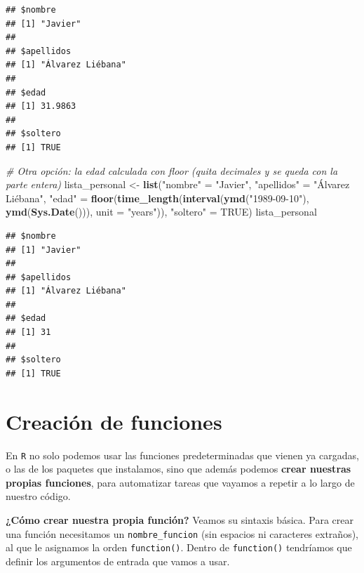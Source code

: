 \documentclass[11pt,]{book}
\newenvironment{Shaded}{\begin{snugshade}}{\end{snugshade}}
\newcommand{\CommentTok}[1]{\textcolor[rgb]{0.37,0.37,0.37}{\textit{#1}}}
\newcommand{\DataTypeTok}[1]{\textcolor[rgb]{0.27,0.27,0.27}{#1}}
\newcommand{\KeywordTok}[1]{\textcolor[rgb]{0.27,0.27,0.27}{\textbf{#1}}}
\newcommand{\NormalTok}[1]{#1}
\newcommand{\OtherTok}[1]{\textcolor[rgb]{0.37,0.37,0.37}{#1}}
\newcommand{\StringTok}[1]{\textcolor[rgb]{0.5,0.5,0.5}{#1}}
\begin{document}
\begin{verbatim}
## $nombre
## [1] "Javier"
## 
## $apellidos
## [1] "Álvarez Liébana"
## 
## $edad
## [1] 31.9863
## 
## $soltero
## [1] TRUE
\end{verbatim}

\begin{Shaded}
\begin{Highlighting}[]
\CommentTok{# Otra opción: la edad calculada con floor (quita decimales y se queda con la parte entera)}
\NormalTok{lista_personal <-}\StringTok{ }\KeywordTok{list}\NormalTok{(}\StringTok{"nombre"}\NormalTok{ =}\StringTok{ "Javier"}\NormalTok{,}
                       \StringTok{"apellidos"}\NormalTok{ =}\StringTok{ "Álvarez Liébana"}\NormalTok{,}
                       \StringTok{"edad"}\NormalTok{ =}\StringTok{ }\KeywordTok{floor}\NormalTok{(}\KeywordTok{time_length}\NormalTok{(}\KeywordTok{interval}\NormalTok{(}\KeywordTok{ymd}\NormalTok{(}\StringTok{"1989-09-10"}\NormalTok{), }\KeywordTok{ymd}\NormalTok{(}\KeywordTok{Sys.Date}\NormalTok{())), }\DataTypeTok{unit =} \StringTok{"years"}\NormalTok{)),}
                       \StringTok{"soltero"}\NormalTok{ =}\StringTok{ }\OtherTok{TRUE}\NormalTok{)}
\NormalTok{lista_personal}
\end{Highlighting}
\end{Shaded}

\begin{verbatim}
## $nombre
## [1] "Javier"
## 
## $apellidos
## [1] "Álvarez Liébana"
## 
## $edad
## [1] 31
## 
## $soltero
## [1] TRUE
\end{verbatim}

\hypertarget{FUNCIONES}{%
\chapter{Creación de funciones}\label{FUNCIONES}}

En \texttt{R} no solo podemos usar las funciones predeterminadas que vienen ya cargadas, o las de los paquetes que instalamos, sino que además podemos \textbf{crear nuestras propias funciones}, para automatizar tareas que vayamos a repetir a lo largo de nuestro código.

\textbf{¿Cómo crear nuestra propia función?} Veamos su sintaxis básica. Para crear una función necesitamos un \texttt{nombre\_funcion} (sin espacios ni caracteres extraños), al que le asignamos la orden \texttt{function()}. Dentro de \texttt{function()} tendríamos que definir los argumentos de entrada que vamos a usar.
\end{document}
